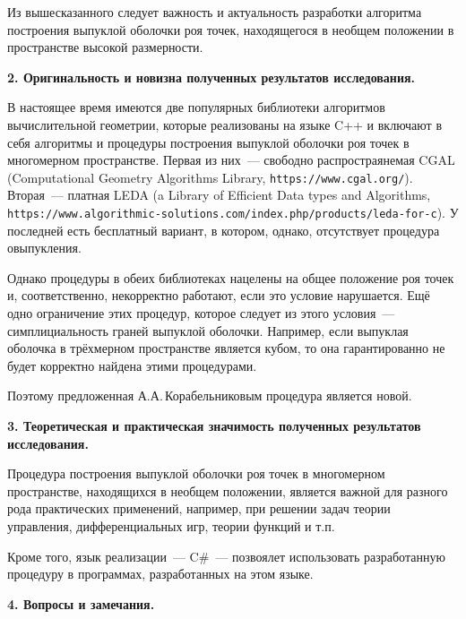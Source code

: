 \documentclass[12pt]{article}
\begin{document}
Из вышесказанного следует важность и актуальность разработки алгоритма построения выпуклой оболочки роя точек, находящегося в необщем положении в пространстве высокой размерности.

\smallskip

\noindent
\textbf{2. Оригинальность и новизна полученных результатов исследования.}

\smallskip

В настоящее время имеются две популярных библиотеки алгоритмов вычислительной геометрии, которые реализованы на языке C++ и включают в себя алгоритмы и процедуры построения выпуклой оболочки роя точек в многомерном пространстве. Первая из них~--- свободно распростраянемая CGAL (Computational Geometry Algorithms Library, \texttt{https://www.cgal.org/}). Вторая~--- платная LEDA (a Library of Efficient Data types and Algorithms, \texttt{https://www.algorithmic-solutions.com/index.php/products/leda-for-c}). У последней есть бесплатный вариант, в котором, однако, отсутствует процедура овыпукления.

Однако процедуры в обеих библиотеках нацелены на общее положение роя точек и, соответственно, некорректно работают, если это условие нарушается. Ещё одно ограничение этих процедур, которое следует из этого условия~--- симплициальность граней выпуклой оболочки. Например, если выпуклая оболочка в трёхмерном пространстве является кубом, то она гарантированно не будет корректно найдена этими процедурами.

Поэтому предложенная А.А.\,Корабельниковым процедура является новой.

\smallskip

{\raggedright

\noindent
\textbf{3. Теоретическая и практическая значимость полученных результатов исследования.}

}

\smallskip

Процедура построения выпуклой оболочки роя точек в многомерном пространстве, находящихся в необщем положении, является важной для разного рода практических применений, например, при решении задач теории управления, дифференциальных игр, теории функций и т.п.

Кроме того, язык реализации~--- C\#~--- позвоялет использовать разработанную процедуру в программах, разработанных на этом языке.

\smallskip

\noindent
\textbf{4. Вопросы и замечания.}

\smallskip
\end{document}
